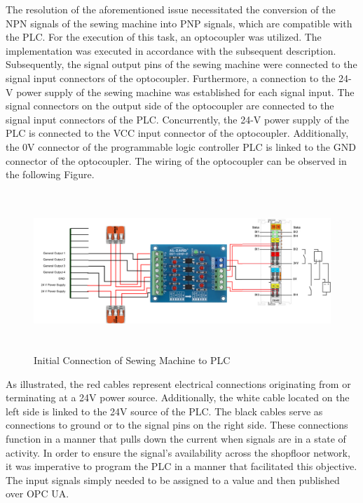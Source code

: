 The resolution of the aforementioned issue necessitated the conversion of the NPN signals of the sewing machine into PNP signals, which are compatible with the PLC. For the execution of this task, an optocoupler was utilized. The implementation was executed in accordance with the subsequent description. Subsequently, the signal output pins of the sewing machine were connected to the signal input connectors of the optocoupler. Furthermore, a connection to the 24-V power supply of the sewing machine was established for each signal input. The signal connectors on the output side of the optocoupler are connected to the signal input connectors of the PLC. Concurrently, the 24-V power supply of the PLC is connected to the VCC input connector of the optocoupler. Additionally, the 0V connector of the programmable logic controller PLC is linked to the GND connector of the optocoupler. The wiring of the optocoupler can be observed in the following Figure.
\begin{figure}[H]
	\centering
	\includegraphics[height=6cm]{pic/sewing-machine-opto-plc.png}
	\caption{Initial Connection of Sewing Machine to PLC}
	\label{fig:Model-Component-Pattern}
\end{figure}
As illustrated, the red cables represent electrical connections originating from or terminating at a 24V power source. Additionally, the white cable located on the left side is linked to the 24V source of the PLC. The black cables serve as connections to ground or to the signal pins on the right side. These connections function in a manner that pulls down the current when signals are in a state of activity.
In order to ensure the signal's availability across the shopfloor network, it was imperative to program the PLC in a manner that facilitated this objective. The input signals simply needed to be assigned to a value and then published over OPC UA. \\
